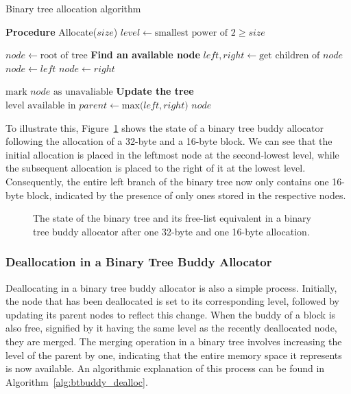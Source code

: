 \begin{algorithm}
    \caption{Binary tree allocation algorithm}
    \label{alg:btbuddy_alloc}
    \begin{algorithmic}[1]
        \Statex \textbf{Procedure} Allocate($size$)
        \State $level \gets \text{smallest power of 2} \geq size$

        \State $node \gets \text{root of tree}$
        \Statex \textbf{Find an available node}
        \State $left, right \gets \text{get children of } node$
        \State $node \gets left$
        \Else
        \State $node \gets right$
        \EndIf
        \EndWhile

        \State \Return {}
        \EndIf

        \State $\text{mark } node \text{ as unavaliable}$
        \Statex \textbf{Update the tree}
        \State $\text{level available in } parent \gets \text{max(}left,right\text{)}$
        \EndFor
        \State \Return $node$
    \end{algorithmic}
\end{algorithm}

To illustrate this, Figure~\ref{fig:btbudydallocated} shows the state of a binary tree buddy allocator following the allocation of a 32-byte and a 16-byte block. We can see that the initial allocation is placed in the leftmost node at the second-lowest level, while the subsequent allocation is placed to the right of it at the lowest level. Consequently, the entire left branch of the binary tree now only contains one 16-byte block, indicated by the presence of only ones stored in the respective nodes.

\begin{figure}[h]
    \centering
    
    \caption{The state of the binary tree and its free-list equivalent in a binary tree buddy allocator after one 32-byte and one 16-byte allocation.}
    \label{fig:btbudydallocated}
\end{figure}

\subsubsection{Deallocation in a Binary Tree Buddy Allocator}
Deallocating in a binary tree buddy allocator is also a simple process. Initially, the node that has been deallocated is set to its corresponding level, followed by updating its parent nodes to reflect this change. When the buddy of a block is also free, signified by it having the same level as the recently deallocated node, they are merged. The merging operation in a binary tree involves increasing the level of the parent by one, indicating that the entire memory space it represents is now available. An algorithmic explanation of this process can be found in Algorithm~\ref{alg:btbuddy_dealloc}.

